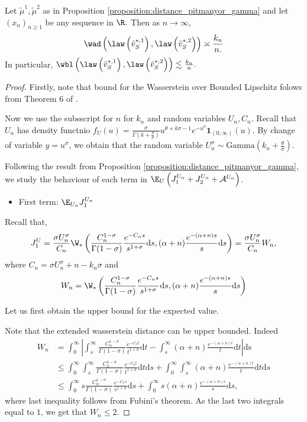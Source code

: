 \begin{theorem}
    Let $\tilde{\mu}^1, \tilde{\mu}^2$ as in Proposition \ref{proposition:distance_pitmanyor_gamma} and let $(x_n)_{n\geq 1}$ be any sequence in $\R.$
    Then as $n \to \infty,$
    \[
    \wad \left( \law\left(\tilde{v}^{*,1}_{S}\right),  \law\left(\tilde{v}^{*,2}_{S}\right) \right) \asymp \frac{k_n}{n.}
    \]
    In particular, $\wbl \left( \law\left(\tilde{v}^{*,1}_{S}\right),  \law\left(\tilde{v}^{*,2}_{S}\right) \right) \lesssim \frac{k_n}{n}.$
\end{theorem}
\begin{proof}
    Firstly, note that bound for the Wasserstein over Bounded Lipschitz folows from Theorem $6$ of \cite{catalano2023merging}.

    Now we use the subsscript for $n$ for $k_n$ and random variables $U_n, C_n$. Recall that $U_n$ has density functnio $f_U(u) =\frac{\sigma}{\Gamma\left(k+\frac{\theta}{\sigma}\right)} u^{\theta + k\sigma - 1}e^{-u^\sigma}\mathbf{1}_{(0,\infty)}(u)$. By change of variable $y = u^\sigma$, we obtain that the random variable $U_n^\sigma \sim \mathrm{Gamma}\left(k_n + \frac{\theta}{\sigma} \right).$
    
    Following the result from Proposition \ref{proposition:distance_pitmanyor_gamma}, we study the behaviour of each term in $\E_U\left(J^{U_n}_1 + J_2^{U_n} + \mathcal{A}^{U_n}\right)$.
    \begin{itemize}
        \item First term: $\E_{U_n} J^{U_n}_1$
    \end{itemize}
    Recall that,
    \[
    J_1^U = \frac{ \sigma U_n^\sigma}{C_n}\W_*\left( \frac{C_n^{1-\sigma}}{\Gamma(1-\sigma)}\frac{e^{-C_ns}}{s^{1+\sigma}}\mathrm{d}s, (\alpha+n)\frac{e^{-(\alpha+n)s}}{s}\mathrm{d}s\right) =  \frac{ \sigma U_n^\sigma}{C_n} W_n,
    \]
    where $C_n = \sigma U_n^\sigma + n - k_n\sigma$ and 
    \[
    W_n = \W_*\left( \frac{C_n^{1-\sigma}}{\Gamma(1-\sigma)}\frac{e^{-C_ns}}{s^{1+\sigma}}\mathrm{d}s, (\alpha+n)\frac{e^{-(\alpha+n)s}}{s} \mathrm{d}s\right)
    \]
    

    Let us first obtain the upper bound for the expected value.

    Note that the extended wasserstein distance can be upper bounded. Indeed
    \begin{align*}
        W_n &= 
        \int_0^\infty \left| \int_s^\infty \frac{C_n^{1-\sigma}}{\Gamma(1-\sigma)}\frac{e^{-C_nt}}{t^{1+\sigma}}\mathrm{d}t - 
        \int_s^\infty (\alpha+n)\frac{e^{-(\alpha+n)t}}{t} \mathrm{d}t \right| \mathrm{ds}\\ 
        & \leq \int_0^\infty  \int_s^\infty \frac{C_n^{1-\sigma}}{\Gamma(1-\sigma)}\frac{e^{-C_nt}}{t^{1+\sigma}}\mathrm{d}t\mathrm{d}s + 
        \int_0^\infty\int_s^\infty (\alpha+n)\frac{e^{-(\alpha+n)t}}{t} \mathrm{d}t\mathrm{d}s \\
        & \leq \int_0^\infty s \frac{C_n^{1-\sigma}}{\Gamma(1-\sigma)}\frac{e^{-C_ns}}{s^{1+\sigma}}\mathrm{d}s + 
        \int_0^\infty s  (\alpha+n)\frac{e^{-(\alpha+n)s}}{s} \mathrm{d}s,
    \end{align*}
    where last inequality follows from Fubini's theorem. As the last two integrals equal to $1$, we get that $W_n \leq 2.$
    

\end{proof}
